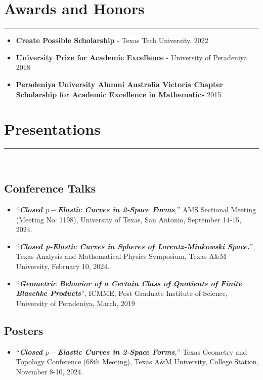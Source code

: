 \documentclass[12pt]{book}
\begin{document}
\section*{Awards and Honors}
\rule{\textwidth}{1pt}

\begin{itemize}
	\item \textbf{Create Possible Scholarship} - Texas Tech University. \hfill 2022
	\item \textbf{University Prize for Academic Excellence} - University of Peradeniya \hfill 2018
	\item \textbf{Peradeniya University Alumni Australia Victoria Chapter Scholarship for Academic Excellence in Mathematics} \hfill 2015
\end{itemize}



\section*{Presentations}
\rule{\textwidth}{1pt}\\
\subsection*{Conference Talks}
\begin{itemize}
	\item ``\textit{\textbf{Closed $p-$Elastic Curves in 2-Space Forms},}'' AMS Sectional Meeting (Meeting No: 1198), University of Texas, San Antonio, September 14-15, 2024.
	\item ``\textit{\textbf{Closed p-Elastic Curves in Spheres of Lorentz-Minkowski Space.}}'', Texas Analysis and Mathematical Physics Symposium, Texas A\&M University, February 10, 2024.
	\item ``\textit{\textbf{Geometric Behavior of a Certain Class of Quotients of Finite Blaschke Products}}'', ICMME, Post Graduate Institute of Science, University of Peradeniya, March, 2019
\end{itemize}

\subsection*{Posters}
\begin{itemize}
	\item ``\textit{\textbf{Closed $p-$Elastic Curves in 2-Space Forms},}'' Texas Geometry and Topology Conference (68th Meeting),  Texas A\&M University, College  Station, November 8-10, 2024.
\end{itemize}
\end{document}
